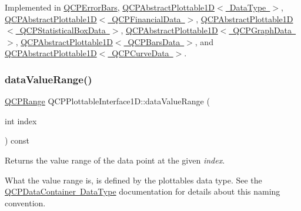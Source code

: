 Implemented in \mbox{\hyperlink{class_q_c_p_error_bars_a1ef91328ad7dde84695958139d5f40cf}{Q\+C\+P\+Error\+Bars}}, \mbox{\hyperlink{class_q_c_p_abstract_plottable1_d_a6fce4e684f33a31c45928899b5d9ab4b}{Q\+C\+P\+Abstract\+Plottable1\+D$<$ Data\+Type $>$}}, \mbox{\hyperlink{class_q_c_p_abstract_plottable1_d_a6fce4e684f33a31c45928899b5d9ab4b}{Q\+C\+P\+Abstract\+Plottable1\+D$<$ Q\+C\+P\+Financial\+Data $>$}}, \mbox{\hyperlink{class_q_c_p_abstract_plottable1_d_a6fce4e684f33a31c45928899b5d9ab4b}{Q\+C\+P\+Abstract\+Plottable1\+D$<$ Q\+C\+P\+Statistical\+Box\+Data $>$}}, \mbox{\hyperlink{class_q_c_p_abstract_plottable1_d_a6fce4e684f33a31c45928899b5d9ab4b}{Q\+C\+P\+Abstract\+Plottable1\+D$<$ Q\+C\+P\+Graph\+Data $>$}}, \mbox{\hyperlink{class_q_c_p_abstract_plottable1_d_a6fce4e684f33a31c45928899b5d9ab4b}{Q\+C\+P\+Abstract\+Plottable1\+D$<$ Q\+C\+P\+Bars\+Data $>$}}, and \mbox{\hyperlink{class_q_c_p_abstract_plottable1_d_a6fce4e684f33a31c45928899b5d9ab4b}{Q\+C\+P\+Abstract\+Plottable1\+D$<$ Q\+C\+P\+Curve\+Data $>$}}.

\mbox{\label{class_q_c_p_plottable_interface1_d_a9ca7fcf14d885a200879768679b19be9}} 
\subsubsection{\texorpdfstring{data\+Value\+Range()}{dataValueRange()}}
{\footnotesize\ttfamily \mbox{\hyperlink{class_q_c_p_range}{Q\+C\+P\+Range}} Q\+C\+P\+Plottable\+Interface1\+D\+::data\+Value\+Range (\begin{DoxyParamCaption}\item[{int}]{index }\end{DoxyParamCaption}) const\hspace{0.3cm}{\ttfamily [pure virtual]}}

Returns the value range of the data point at the given {\itshape index}.

What the value range is, is defined by the plottable\textquotesingle{}s data type. See the \mbox{\hyperlink{class_q_c_p_data_container_qcpdatacontainer-datatype}{Q\+C\+P\+Data\+Container Data\+Type}} documentation for details about this naming convention. 

